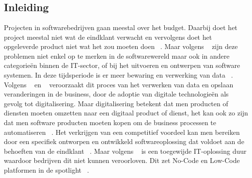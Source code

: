 \chapter{}%
\label{ch:stand-van-zaken}

\section{Inleiding}%
\label{sec:inleiding}
Projecten in softwarebedrijven gaan meestal over het budget. Daarbij doet het project meestal niet wat de eindklant verwacht en vervolgens doet het opgeleverde product niet wat het zou moeten doen ~\autocite{Moskal_2021}.
Maar volgens ~\textcite{Moskal_2021} zijn deze problemen niet enkel op te merken in de softwarewereld maar ook in andere categorieën binnen de IT-sector,
of bij het uitvoeren en ontwerpen van software systemen. In deze tijdsperiode is er meer bewaring en verwerking van data ~\autocite{Moskal_2021}.
Volgens ~\textcite{Moskal_2021} en ~\textcite{Parviainen_2022} veroorzaakt dit proces van het verwerken van data en opslaan veranderingen in de business, 
door de adoptie van digitale technologieën als gevolg tot digitalisering. Maar digitalisering betekent dat men producten of diensten moeten omzetten naar een digitaal product 
of dienst, het kan ook zo zijn dat men software producten moeten kopen om de business processen te automatiseren ~\autocite{Moskal_2021}. 
Het verkrijgen van een competitief voordeel kan men bereiken door een specifiek ontworpen en ontwikkeld softwareoplossing dat voldoet aan de behoeften van de eindklant ~\autocite{Moskal_2021}.
Maar volgens ~\textcite{Moskal_2021} is een toegewijde IT-oplossing duur waardoor bedrijven dit niet kunnen veroorloven. Dit zet No-Code en Low-Code platformen in de spotlight ~\autocite{Moskal_2021}.

